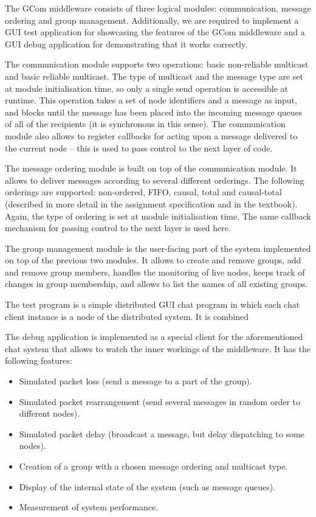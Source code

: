 \documentclass[10pt, oneside]{article}
\begin{document}
The GCom middleware consists of three logical modules: communication, message
ordering and group management. Additionally, we are required to implement a GUI
test application for showcasing the features of the GCom middleware and a GUI
debug application for demonstrating that it works correctly.

The communication module supports two operations: basic non-reliable multicast
and basic reliable multicast. The type of multicast and the message type are set
at module initialisation time, so only a single send operation is accessible at
runtime. This operation takes a set of node identifiers and a message as input,
and blocks until the message has been placed into the incoming message queues of
all of the recipients (it is synchronous in this sense). The communication
module also allows to register callbacks for acting upon a message delivered to
the current node -- this is used to pass control to the next layer of code.

The message ordering module is built on top of the communication module. It
allows to deliver messages according to several different orderings. The
following orderings are supported: non-ordered, FIFO, causal, total and
causal-total (described in more detail in the assignment specification and in
the textbook\cite{Textbook}). Again, the type of ordering is set at module
initialisation time. The same callback mechanism for passing control to the next
layer is used here.

The group management module is the user-facing part of the system implemented on
top of the previous two modules. It allows to create and remove groups, add and
remove group members, handles the monitoring of live nodes, keeps track of
changes in group membership, and allows to list the names of all existing
groups.

The test program is a simple distributed GUI chat program in which each chat
client instance is a node of the distributed system. It is combined

The debug application is implemented as a special client for the aforementioned
chat system that allows to watch the inner workings of the middleware. It has
the following features:
\begin{itemize}
\item Simulated packet loss (send a message to a part of the group).
\item Simulated packet rearrangement (send several messages in random order to
  different nodes).
\item Simulated packet delay (broadcast a message, but delay dispatching to some
  nodes).
\item Creation of a group with a chosen message ordering and multicast type.
\item Display of the internal state of the system (such as message queues).
\item Measurement of system performance.
\end{itemize}
\end{document}
